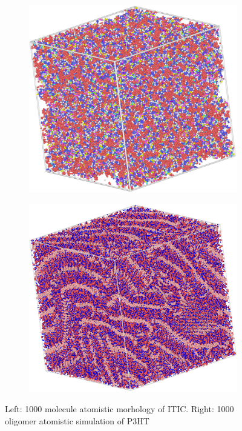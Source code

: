\begin{figure}
\centering
\begin{subfigure}{.5\textwidth}
    \includegraphics[width=\textwidth]{figures/ITIC.png}
\end{subfigure}%
\begin{subfigure}{.5\textwidth}
    \includegraphics[width=\textwidth]{figures/P3HT.png}
\end{subfigure}
    \caption[short]{Left: 1000 molecule atomistic morhology of ITIC. Right: 1000 oligomer atomistic simulation
    of P3HT
    }
\label{ITIC/P3HT}
\end{figure}

